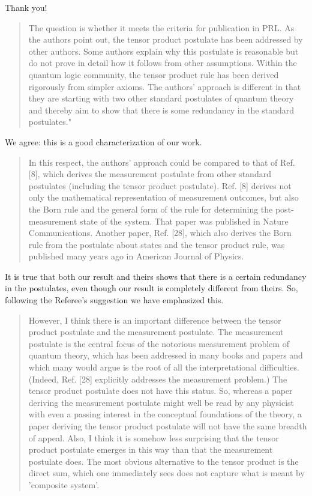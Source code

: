 \documentclass[11pt]{article}
\begin{document}
Thank you!

\begin{quote}The question is whether it meets the criteria for
publication in PRL.  As the authors point out, the tensor product
postulate has been addressed by other authors. Some authors explain
why this postulate is reasonable but do not prove in detail how it
follows from other assumptions. Within the quantum logic community,
the tensor product rule has been derived rigorously from simpler
axioms. The authors' approach is different in that they are starting
with two other standard postulates of quantum theory and thereby aim
to show that there is some redundancy in the standard postulates."
\end{quote}
We agree: this is a good characterization of our work.

\begin{quote}In this respect, the authors' approach could be compared
to that of Ref. [8], which derives the measurement postulate from
other standard postulates (including the tensor product
postulate). Ref. [8] derives not only the mathematical representation
of measurement outcomes, but also the Born rule and the general form
of the rule for determining the post-measurement state of the
system. That paper was published in Nature Communications. Another
paper, Ref. [28], which also derives the Born rule from the postulate
about states and the tensor product rule, was published many years ago
in American Journal of Physics.
\end{quote}

It is true that both our result and theirs shows that there is a certain redundancy in the postulates, even though our result is completely different from theirs. So, following the Referee's suggestion we have emphasized this.

\begin{quote}However, I think there is an important difference between
the tensor product postulate and the measurement postulate. The
measurement postulate is the central focus of the notorious
measurement problem of quantum theory, which has been addressed in
many books and papers and which many would argue is the root of all
the interpretational difficulties. (Indeed, Ref. [28] explicitly
addresses the measurement problem.) The tensor product postulate does
not have this status. So, whereas a paper deriving the measurement
postulate might well be read by any physicist with even a passing
interest in the conceptual foundations of the theory, a paper deriving
the tensor product postulate will not have the same breadth of
appeal. Also, I think it is somehow less surprising that the tensor
product postulate emerges in this way than that the measurement
postulate does. The most obvious alternative to the tensor product is
the direct sum, which one immediately sees does not capture what is
meant by 'composite system'.\end{quote}
\end{document}
